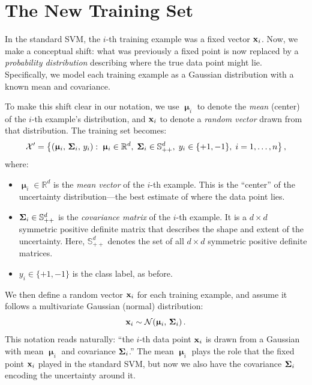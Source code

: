 \documentclass[11pt, letterpaper]{article}
\newcommand{\bSigma}{\vb{\Sigma}}
\newcommand{\bmu}{\boldsymbol{\upmu}}
\newcommand{\R}{\mathbb{R}}
\newcommand{\setX}{\mathcal{X}}
\newcommand{\Norm}{\mathcal{N}}
\begin{document}
\section{The New Training Set}\label{sec:gsu_training_set}

In the standard SVM, the $i$-th training example was a fixed vector $\vb{x}_i$. Now, we make a conceptual shift: what was previously a fixed point is now replaced by a \emph{probability distribution} describing where the true data point might lie. Specifically, we model each training example as a Gaussian distribution with a known mean and covariance.

To make this shift clear in our notation, we use $\bmu_i$ to denote the \emph{mean} (center) of the $i$-th example's distribution, and $\vb{x}_i$ to denote a \emph{random vector} drawn from that distribution. The training set becomes:
\begin{equation}\label{eq:gsu_training_set}
    \setX' = \left\{ \left(\bmu_i,\, \bSigma_i,\, y_i\right) :\; \bmu_i \in \R^d,\; \bSigma_i \in \mathbb{S}^d_{++},\; y_i \in \{+1, -1\},\; i = 1, \ldots, n \right\},
\end{equation}
where:
\begin{itemize}[leftmargin=2em]
    \item $\bmu_i \in \R^d$ is the \emph{mean vector} of the $i$-th example. This is the ``center'' of the uncertainty distribution---the best estimate of where the data point lies.
    \item $\bSigma_i \in \mathbb{S}^d_{++}$ is the \emph{covariance matrix} of the $i$-th example. It is a $d \times d$ symmetric positive definite matrix that describes the shape and extent of the uncertainty. Here, $\mathbb{S}^d_{++}$ denotes the set of all $d \times d$ symmetric positive definite matrices.
    \item $y_i \in \{+1, -1\}$ is the class label, as before.
\end{itemize}
We then define a random vector $\vb{x}_i$ for each training example, and assume it follows a multivariate Gaussian (normal) distribution:
\begin{equation}\label{eq:gsu_rv}
    \vb{x}_i \sim \Norm\!\left(\bmu_i,\, \bSigma_i\right).
\end{equation}
This notation reads naturally: ``the $i$-th data point $\vb{x}_i$ is drawn from a Gaussian with mean $\bmu_i$ and covariance $\bSigma_i$.'' The mean $\bmu_i$ plays the role that the fixed point $\vb{x}_i$ played in the standard SVM, but now we also have the covariance $\bSigma_i$ encoding the uncertainty around it.
\end{document}
